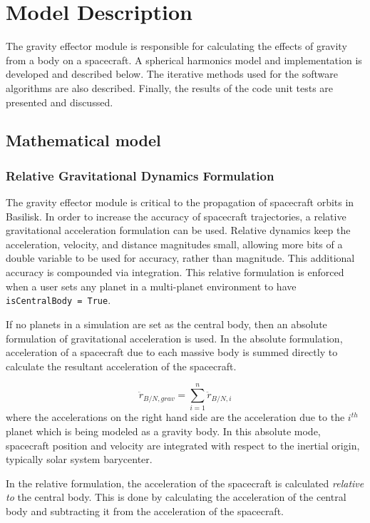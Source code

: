 \section{Model Description}

The gravity effector module is responsible for calculating the effects of gravity from a body on a spacecraft. A spherical harmonics model and implementation is developed and described below. The iterative methods used for the software algorithms are also described. Finally, the results of the code unit tests are presented and discussed.

\subsection{Mathematical model}

\subsubsection{Relative Gravitational Dynamics Formulation}

The gravity effector module is critical to the propagation of spacecraft orbits in Basilisk. In order to increase the accuracy of spacecraft trajectories, a relative gravitational acceleration formulation can be used. Relative dynamics keep the acceleration, velocity, and distance magnitudes small, allowing more bits of a double variable to be used for accuracy, rather than magnitude. This additional accuracy is compounded via integration. This relative formulation is enforced when a user sets any planet in a multi-planet environment to have \verb|isCentralBody = True|.

If no planets in a simulation are set as the central body, then an absolute formulation of gravitational acceleration is used. In the absolute formulation, acceleration of a spacecraft due to each massive body is summed directly to calculate the resultant acceleration of the spacecraft.

\begin{equation}
	\ddot{r}_{B/N, grav} = \sum_{i = 1}^{n} \ddot{r}_{B/N, i}
\end{equation}
where the accelerations on the right hand side are the acceleration due to the $i^{th}$ planet which is being modeled as a gravity body. In this absolute mode, spacecraft position and velocity are integrated with respect to the inertial origin, typically solar system barycenter.

In the relative formulation, the acceleration of the spacecraft is calculated \textit{relative to} the central body. This is done by calculating the acceleration of the central body and subtracting it from the acceleration of the spacecraft.

